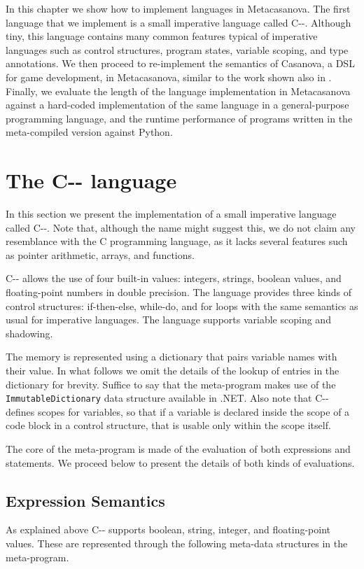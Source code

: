 In this chapter we show how to implement languages in Metacasanova. The first language that we implement is a small imperative language called C-{}-. Although tiny, this language contains many common features typical of imperative languages such as control structures, program states, variable scoping, and type annotations. We then proceed to re-implement the semantics of Casanova, a DSL for game development, in Metacasanova, similar to the work shown also in \cite{DiGiacomo2017}. Finally, we evaluate the length of the language implementation in Metacasanova against a hard-coded implementation of the same language in a general-purpose programming language, and the runtime performance of programs written in the meta-compiled version against Python.

\section{The C-{}- language}
In this section we present the implementation of a small imperative language called C-{}-. Note that, although the name might suggest this, we do not claim any resemblance with the C programming language, as it lacks several features such as pointer arithmetic, arrays, and functions.

C-{}- allows the use of four built-in values: integers, strings, boolean values, and floating-point numbers in double precision. The language provides three kinds of control structures: if-then-else, while-do, and for loops with the same semantics as usual for imperative languages. The language supports variable scoping and shadowing.

The memory is represented using a dictionary that pairs variable names with their value. In what follows we omit the details of the lookup of entries in the dictionary for brevity. Suffice to say that the meta-program makes use of the \texttt{ImmutableDictionary} data structure available in .NET. Also note that C-{}- defines scopes for variables, so that if a variable is declared inside the scope of a code block in a control structure, that is usable only within the scope itself.

The core of the meta-program is made of the evaluation of both expressions and statements. We proceed below to present the details of both kinds of evaluations.

\subsection{Expression Semantics}
\label{subsec:ch_mcnv_languages_expression_semantics}
As explained above C-{}- supports boolean, string, integer, and floating-point values. These are represented through the following meta-data structures in the meta-program.

